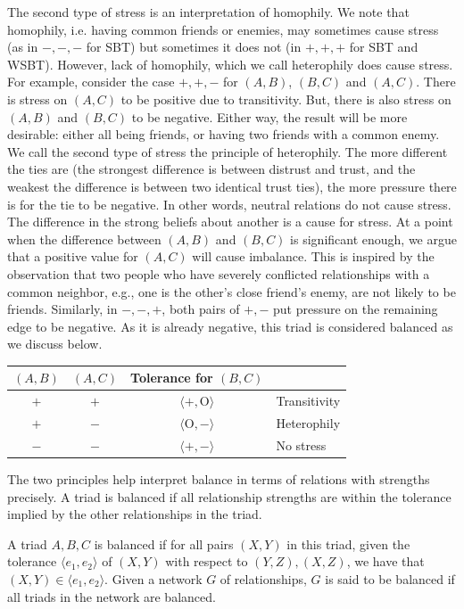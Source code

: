 \documentclass[acmtweb]{acmsmall}
\newcommand{\tuple}[2] {\langle #1,#2\rangle}
\begin{document}
The second type of stress is an interpretation of homophily. We note
that homophily, i.e. having common friends or enemies, may sometimes
cause stress (as in $-,-,-$ for SBT) but sometimes it does not (in
$+,+,+$ for SBT and WSBT). However, lack of homophily, which we call
heterophily does cause stress. For example, consider the case $+,+,-$
for $(A,B)$, $(B,C)$ and $(A,C)$. There is stress on $(A,C)$ to be
positive due to transitivity. But, there is also stress on $(A,B)$ and
$(B,C)$ to be negative. Either way, the result will be more desirable:
either all being friends, or having two friends with a common
enemy. We call the second type of stress the principle of
heterophily. The more different the ties are (the strongest difference
is between distrust and trust, and the weakest the difference is
between two identical trust ties), the more pressure there is for the
tie to be negative. In other words, neutral relations do not cause
stress. The difference in the strong beliefs about another is a cause
for stress.  At a point when the difference between $(A,B)$ and
$(B,C)$ is significant enough, we argue that a positive value for
$(A,C)$ will cause imbalance. This is inspired by the observation that
two people who have severely conflicted relationships with a common
neighbor, e.g., one is the other's close friend's enemy, are not
likely to be friends. Similarly, in $-,-,+$, both pairs of $+,-$ put
pressure on the remaining edge to be negative. As it is already
negative, this triad is considered balanced as we discuss below.

\begin{table}[h]
{
 \begin{tabular}{cc|cl} 
  $(A,B)$ & $(A,C)$ & Tolerance for $(B,C)$ &  \\ \hline
  $+$ & $+$ & $\tuple{+}{\mbox{O}}$ & Transitivity \\
  $+$ & $-$ & $\tuple{\mbox{O}}{-}$ & Heterophily \\ 
  $-$ & $-$ & $\tuple{+}{-}$ & No stress \\ 
 \end{tabular}}
\end{table}

The two principles help interpret balance in terms of relations with
strengths precisely. A triad is balanced if all relationship strengths
are within the tolerance implied by the other relationships in the
triad.

\begin{definition} [Balance]
A triad $A,B,C$ is balanced if for all pairs $(X,Y)$ in this triad,
given the tolerance $\tuple{e_1}{e_2}$ of $(X,Y)$ with respect to
$(Y,Z),(X,Z)$, we have that $(X,Y)\in \tuple{e_1}{e_2}$.  Given a
network $G$ of relationships, $G$ is said to be balanced if all triads
in the network are balanced.
\end{definition}
\end{document}

